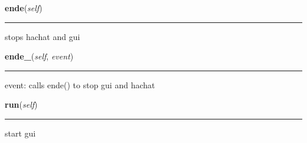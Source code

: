     \label{gui:gui:ende}

    \vspace{0.5ex}

\hspace{.8\funcindent}\begin{boxedminipage}{\funcwidth}

    \raggedright \textbf{ende}(\textit{self})

    \vspace{-1.5ex}

    \rule{\textwidth}{0.5\fboxrule}
\setlength{\parskip}{2ex}
    stops hachat and gui

\setlength{\parskip}{1ex}
    \end{boxedminipage}

    \label{gui:gui:ende_}

    \vspace{0.5ex}

\hspace{.8\funcindent}\begin{boxedminipage}{\funcwidth}

    \raggedright \textbf{ende\_}(\textit{self}, \textit{event})

    \vspace{-1.5ex}

    \rule{\textwidth}{0.5\fboxrule}
\setlength{\parskip}{2ex}
    event: calls ende() to stop gui and hachat

\setlength{\parskip}{1ex}
    \end{boxedminipage}

    \label{gui:gui:run}

    \vspace{0.5ex}

\hspace{.8\funcindent}\begin{boxedminipage}{\funcwidth}

    \raggedright \textbf{run}(\textit{self})

    \vspace{-1.5ex}

    \rule{\textwidth}{0.5\fboxrule}
\setlength{\parskip}{2ex}
    start gui

\setlength{\parskip}{1ex}
    \end{boxedminipage}

